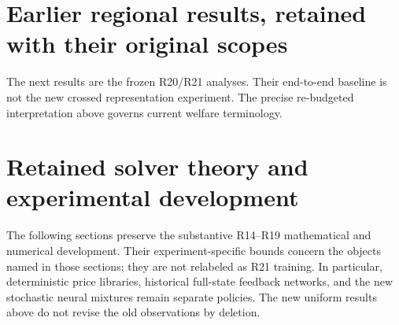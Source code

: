 




\section{Earlier regional results, retained with their original scopes}
The next results are the frozen R20/R21 analyses. Their end-to-end baseline is not the new crossed representation experiment. The precise re-budgeted interpretation above governs current welfare terminology.


\section{Retained solver theory and experimental development}
The following sections preserve the substantive R14--R19 mathematical and numerical development. Their experiment-specific bounds concern the objects named in those sections; they are not relabeled as R21 training. In particular, deterministic price libraries, historical full-state feedback networks, and the new stochastic neural mixtures remain separate policies. The new uniform results above do not revise the old observations by deletion.
















